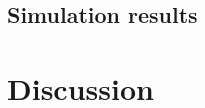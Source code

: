 \documentclass[12pt]{article}
\begin{document}
\subsection{Simulation results
}


\section{Discussion}\label{Sec:dis}



%	
%	
%		
%
%
\end{document}
